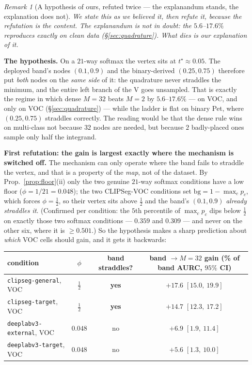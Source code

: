 \documentclass[11pt]{article}
\theoremstyle{remark}
\newtheorem{remark}{Remark}
\begin{document}
\begin{remark}[A hypothesis of ours, refuted twice --- the explanandum stands, the
explanation does not]\label{rem:straddle}
\emph{We state this as we believed it, then refute it, because the refutation is the
content. The explanandum is not in doubt: the $5.6$--$17.6\%$ reproduces exactly on
clean data (\S\ref{sec:quadrature}). What dies is our explanation of it.}

\textbf{The hypothesis.} On a $21$-way softmax the vertex sits at $t^\star\approx0.05$.
The deployed band's nodes $(0.1, 0.9)$ and the binary-derived $(0.25, 0.75)$ therefore
put \emph{both} nodes on the \emph{same side} of it: the quadrature never straddles the
minimum, and the entire left branch of the V goes unsampled. That is exactly the regime
in which dense $M{=}32$ beats $M{=}2$ by $5.6$--$17.6\%$ --- on VOC, and only on VOC
(\S\ref{sec:quadrature}) --- while the ladder is flat on binary Pet, where $(0.25,0.75)$
straddles correctly. The reading would be that the dense rule wins on multi-class not
because $32$ nodes are needed, but because $2$ badly-placed ones sample only half the
integrand.

\textbf{First refutation: the gain is largest exactly where the mechanism is switched
off.} The mechanism can only operate where the band fails to straddle the vertex, and
that is a property of the \emph{map}, not of the dataset. By Prop.~\ref{prop:floor}(ii)
only the two genuine $21$-way softmax conditions have a low floor
($\phi = 1/21 = 0.048$); the two CLIPSeg-VOC conditions set
$\mathrm{bg} = 1-\max_c p_c$, which forces $\phi = \tfrac12$, so their vertex sits above
$\tfrac12$ and the band's $(0.1,0.9)$ \emph{already straddles it}. (Confirmed per
condition: the $5$th percentile of $\max_c p_c$ dips below $\tfrac12$ on exactly those
two softmax conditions --- $0.359$ and $0.309$ --- and never on the other six, where it
is $\ge 0.501$.) So the hypothesis makes a sharp prediction about \emph{which} VOC cells
should gain, and it gets it backwards:

\begin{center}
\small
\begin{tabular}{lccc}
\toprule
condition & $\phi$ & band straddles? & band $\to M{=}32$ gain (\% of band AURC, $95\%$ CI) \\
\midrule
\texttt{clipseg-general}, VOC    & $\tfrac12$  & \textbf{yes} & $\mathbf{+17.6}$ \; $[15.0,\ 19.9]$ \\
\texttt{clipseg-target}, VOC     & $\tfrac12$  & \textbf{yes} & $\mathbf{+14.7}$ \; $[12.3,\ 17.2]$ \\
\texttt{deeplabv3-external}, VOC & $0.048$ & no  & $+6.9$ \; $[1.9,\ 11.4]$ \\
\texttt{deeplabv3-target}, VOC   & $0.048$ & no  & $+5.6$ \; $[1.3,\ 10.0]$ \\
\bottomrule
\end{tabular}
\end{center}


\end{remark}
\end{document}
